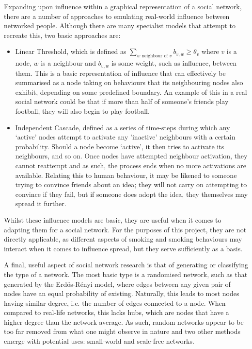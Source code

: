 \documentclass[]{report}
\begin{document}
Expanding upon influence within a graphical representation of a social network, there are a number of approaches to emulating real-world influence between networked people. Although there are many specialist models that attempt to recreate this, two basic approaches are:
\begin{itemize}
\item Linear Threshold, which is defined as $\sum\limits_{w \text{ neighbour of } v}^{} b_{v,w} \geq \theta_{v} $ where $v$ is a node, $w$ is a neighbour and $b_{v,w}$ is some weight, such as influence, between them\cite{inf-papers}. This is a basic representation of influence that can effectively be summarised as a node taking on behaviours that its neighbouring nodes also exhibit, depending on some predefined boundary. An example of this in a real social network could be that if more than half of someone's friends play football, they will also begin to play football.
\item Independent Cascade, defined as a series of time-steps during which any `active' nodes attempt to activate any 'inactive' neighbours with a certain probability\cite{inf-papers}. Should a node become `active', it then tries to activate its neighbours, and so on. Once nodes have attempted neighbour activation, they cannot reattempt and as such, the process ends when no more activations are available. Relating this to human behaviour, it may be likened to someone trying to convince friends about an idea; they will not carry on attempting to convince if they fail, but if someone does adopt the idea, they themselves may spread it further.
\end{itemize}
Whilst these influence models are basic, they are useful when it comes to adapting them for a social network. For the purposes of this project, they are not directly applicable, as different aspects of smoking and smoking behaviours may interact when it comes to influence spread, but they serve sufficiently as a basis.


A final, useful aspect of social network research is that of generating or classifying the type of a network. The most basic type is a randomised network, such as that generated by the Erd\"{o}s-R\'{e}nyi model\cite{erdos}, where edges between any given pair of nodes have an equal probability of existing. Naturally, this leads to most nodes having similar degree, i.e. the number of edges connected to a node. When compared to real-life networks, this lacks hubs, which are nodes that have a higher degree than the network average\cite{BA-SciAm}. As such, random networks appear to be too far removed from what one might observe in nature and two other methods emerge with potential uses: small-world and scale-free networks.
\end{document}
